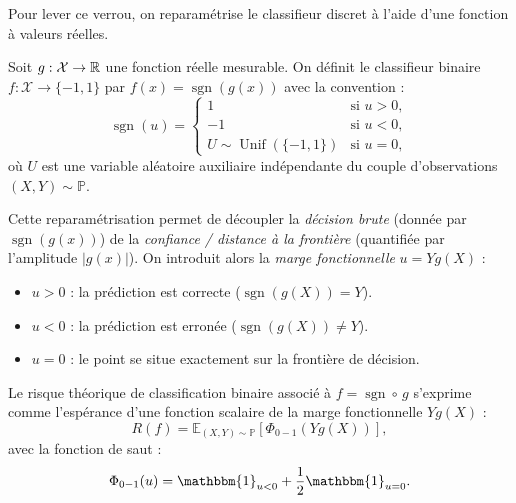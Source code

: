 Pour lever ce verrou, on reparamétrise le classifieur discret à l'aide d'une fonction à valeurs réelles.

\begin{definition}
    Soit $g : \mathcal{X} \to \mathbb{R}$ une fonction réelle mesurable. On définit le classifieur binaire $f : \mathcal{X} \to \{-1, 1\}$ par $f(x) = \operatorname{sgn}(g(x))$ avec la convention :
    \begin{equation}
        \operatorname{sgn}(u) = 
        \begin{cases}
            1 & \text{si } u > 0, \\
            -1 & \text{si } u < 0, \\
            U \sim \operatorname{Unif}(\{-1, 1\}) & \text{si } u = 0,
        \end{cases}
    \end{equation}
    où $U$ est une variable aléatoire auxiliaire indépendante du couple d'observations $(X, Y) \sim \mathbb{P}$.
\end{definition}

Cette reparamétrisation permet de découpler la \emph{décision brute} (donnée par $\operatorname{sgn}(g(x))$) de la \emph{confiance / distance à la frontière} (quantifiée par l'amplitude $|g(x)|$). On introduit alors la \emph{marge fonctionnelle} $u = Y g(X)$ :
\begin{itemize}
    \item $u > 0$ : la prédiction est correcte ($\operatorname{sgn}(g(X)) = Y$).
    \item $u < 0$ : la prédiction est erronée ($\operatorname{sgn}(g(X)) \neq Y$).
    \item $u = 0$ : le point se situe exactement sur la frontière de décision.
\end{itemize}

\begin{proposition}
    Le risque théorique de classification binaire associé à $f = \operatorname{sgn} \circ \, g$ s'exprime comme l'espérance d'une fonction scalaire de la marge fonctionnelle $Y g(X)$ :
    \begin{equation}
        R(f) = \mathbb{E}_{(X,Y) \sim \mathbb{P}} \left[ \Phi_{0-1}(Y g(X)) \right],
    \end{equation}
    avec la fonction de saut :
    \begin{equation}
        \Phi_{0-1}(u) = \mathbbm{1}_{u < 0} + \frac{1}{2} \mathbbm{1}_{u = 0}.
    \end{equation}
\end{proposition}

